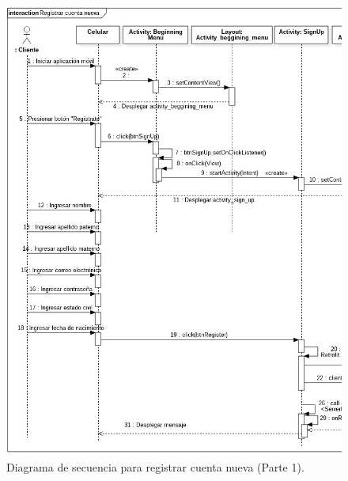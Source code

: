 \FloatBarrier
\begin{figure}[htbp!]
		\centering
			\includegraphics[width=0.9 \textwidth]{imagenes/Diagramas_UserApp/Nuevos_diagramas/CuentaNueva_1}
		\caption{Diagrama de secuencia para registrar cuenta nueva (Parte 1).}
		\label{image:RegistrarCuenta1}
\end{figure}
\FloatBarrier

